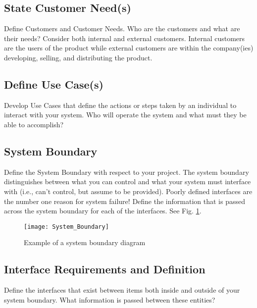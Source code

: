 \documentclass{other/docTemplate}
\begin{document}
\subsection{State Customer Need(s)}
Define Customers and Customer Needs. 
Who are the customers and what are their needs? Consider both internal and external customers. 
Internal customers are the users of the product while external customers are within the company(ies) developing, selling, and distributing the product.


\subsection{Define Use Case(s)}
Develop Use Cases that define the actions or steps taken by an individual to interact with your system.
Who will operate the system and what must they be able to accomplish?
  

\subsection{System Boundary}
Define the System Boundary with respect to your project. 
The system boundary distinguishes between what you can control and what your system must interface with (i.e., can't control, but assume to be provided).
Poorly defined interfaces are the number one reason for system failure! 
Define the information that is passed across the system boundary for each of the interfaces. See Fig. \ref{System Boundary}. 

\begin{figure}[ht!]
\centering
\texttt{[image: System\_Boundary]}
\caption{Example of a system boundary diagram}
\label{System Boundary}
\end{figure}




\subsection{Interface Requirements and Definition}

Define the interfaces that exist between items both inside and outside of your system boundary. What information is passed between these entities? 
\end{document}
